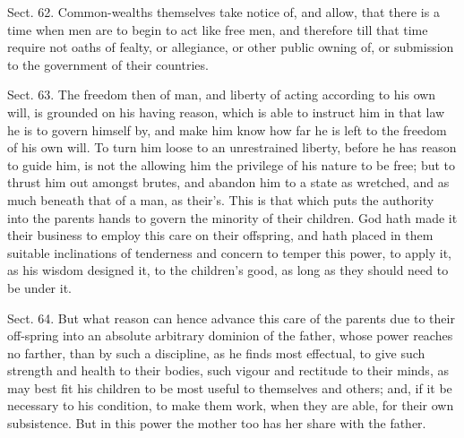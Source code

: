 \documentclass[11pt,openany]{book}
\begin{document}
Sect. 62. Common-wealths themselves take notice of, and allow, that there is a time when men are to begin to act like free men, and therefore till that time require not oaths of fealty, or allegiance, or other public owning of, or submission to the government of their countries.

Sect. 63. The freedom then of man, and liberty of acting according to his own will, is grounded on his having reason, which is able to instruct him in that law he is to govern himself by, and make him know how far he is left to the freedom of his own will. To turn him loose to an unrestrained liberty, before he has reason to guide him, is not the allowing him the privilege of his nature to be free; but to thrust him out amongst brutes, and abandon him to a state as wretched, and as much beneath that of a man, as their's. This is that which puts the authority into the parents hands to govern the minority of their children. God hath made it their business to employ this care on their offspring, and hath placed in them suitable inclinations of tenderness and concern to temper this power, to apply it, as his wisdom designed it, to the children's good, as long as they should need to be under it.

Sect. 64. But what reason can hence advance this care of the parents due to their off-spring into an absolute arbitrary dominion of the father, whose power reaches no farther, than by such a discipline, as he finds most effectual, to give such strength and health to their bodies, such vigour and rectitude to their minds, as may best fit his children to be most useful to themselves and others; and, if it be necessary to his condition, to make them work, when they are able, for their own subsistence. But in this power the mother too has her share with the father.
\end{document}
